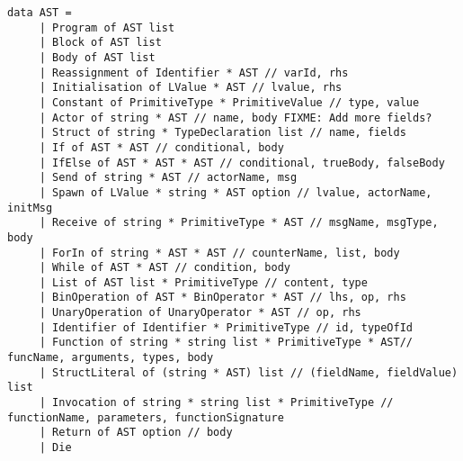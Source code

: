 \begin{lstlisting}[style = fsharp, label = lst:ast_listing, caption = {Data type of AST used throughout the compiler}]
data AST = 
     | Program of AST list
     | Block of AST list
     | Body of AST list
     | Reassignment of Identifier * AST // varId, rhs
     | Initialisation of LValue * AST // lvalue, rhs
     | Constant of PrimitiveType * PrimitiveValue // type, value
     | Actor of string * AST // name, body FIXME: Add more fields?
     | Struct of string * TypeDeclaration list // name, fields
     | If of AST * AST // conditional, body
     | IfElse of AST * AST * AST // conditional, trueBody, falseBody
     | Send of string * AST // actorName, msg
     | Spawn of LValue * string * AST option // lvalue, actorName, initMsg
     | Receive of string * PrimitiveType * AST // msgName, msgType, body
     | ForIn of string * AST * AST // counterName, list, body
     | While of AST * AST // condition, body
     | List of AST list * PrimitiveType // content, type
     | BinOperation of AST * BinOperator * AST // lhs, op, rhs
     | UnaryOperation of UnaryOperator * AST // op, rhs
     | Identifier of Identifier * PrimitiveType // id, typeOfId
     | Function of string * string list * PrimitiveType * AST// funcName, arguments, types, body
     | StructLiteral of (string * AST) list // (fieldName, fieldValue) list
     | Invocation of string * string list * PrimitiveType // functionName, parameters, functionSignature
     | Return of AST option // body
     | Die
\end{lstlisting}